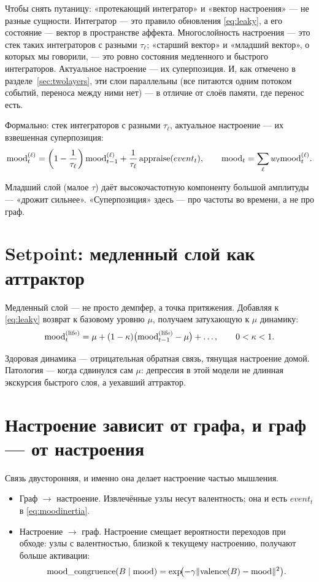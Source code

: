 \begin{intuition}
Чтобы снять путаницу: «протекающий интегратор» и «вектор настроения» --- не
разные сущности. Интегратор --- это правило обновления \eqref{eq:leaky}, а его
состояние --- вектор в пространстве аффекта. Многослойность настроения --- это
стек таких интеграторов с разными $\tau_\ell$; «старший вектор» и «младший
вектор», о которых мы говорили, --- это ровно состояния медленного и быстрого
интеграторов. Актуальное настроение --- их суперпозиция. И, как отмечено в
разделе~\ref{sec:twolayers}, эти слои параллельны (все питаются одним потоком
событий, переноса между ними нет) --- в отличие от слоёв памяти, где перенос
есть.
\end{intuition}

Формально: стек интеграторов с разными $\tau_\ell$, актуальное настроение ---
их взвешенная суперпозиция:
\[
\mathrm{mood}_t^{(\ell)} = \left(1 - \frac{1}{\tau_\ell}\right)\mathrm{mood}_{t-1}^{(\ell)} +
\frac{1}{\tau_\ell}\,\mathrm{appraise}(event_t),
\qquad
\mathrm{mood}_t = \sum_\ell w_\ell \mathrm{mood}_t^{(\ell)}.
\]

Младший слой (малое $\tau$) даёт высокочастотную компоненту большой амплитуды
--- «дрожит сильнее». «Суперпозиция» здесь --- про частоты во времени, а не про
граф.

\section{Setpoint: медленный слой как аттрактор}

Медленный слой --- не просто демпфер, а точка притяжения. Добавляя к
\eqref{eq:leaky} возврат к базовому уровню $\mu$, получаем затухающую к
$\mu$ динамику:
\[
\mathrm{mood}_t^{(\mathrm{life})} =
\mu + (1 - \kappa)\bigl(\mathrm{mood}_{t-1}^{(\mathrm{life})} - \mu\bigr) + \ldots,
\qquad 0 < \kappa < 1.
\]

Здоровая динамика --- отрицательная обратная связь, тянущая настроение домой.
Патология --- когда сдвинулся сам $\mu$: депрессия в этой модели не длинная
экскурсия быстрого слоя, а уехавший аттрактор.

\section{Настроение зависит от графа, и граф --- от настроения}

Связь двусторонняя, и именно она делает настроение частью мышления.
\begin{itemize}
\item Граф $\to$ настроение. Извлечённые узлы несут валентность; она и есть
$event_t$ в \eqref{eq:moodinertia}.
\item Настроение $\to$ граф. Настроение смещает вероятности переходов при
обходе: узлы с валентностью, близкой к текущему настроению, получают больше
активации:
\begin{equation}
\mathrm{mood\_congruence}(B \mid \mathrm{mood}) =
\exp\!\bigl(-\gamma \lVert \mathrm{valence}(B) - \mathrm{mood} \rVert^2\bigr).
\label{eq:moodcong}
\end{equation}
\end{itemize}

